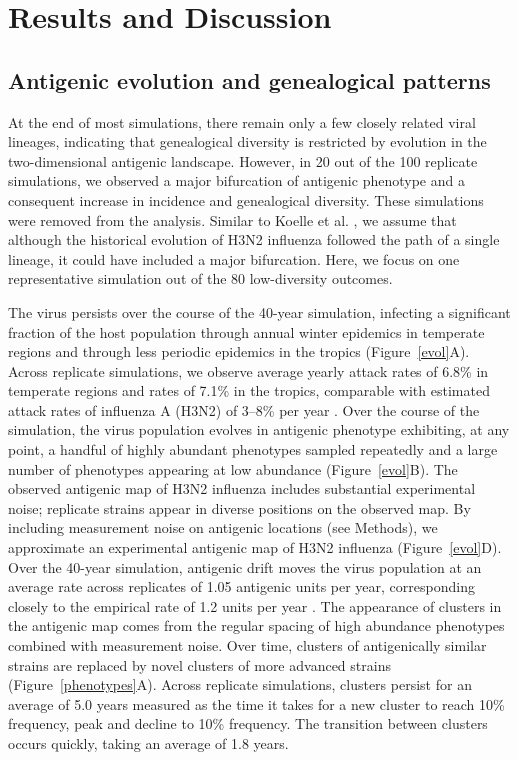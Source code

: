 \documentclass[11pt,oneside,letterpaper]{article}
\begin{document}
\section*{Results and Discussion}

\subsection*{Antigenic evolution and genealogical patterns}

At the end of most simulations, there remain only a few closely related viral lineages, indicating that genealogical diversity is restricted by evolution in the two-dimensional antigenic landscape.  However, in 20 out of the 100 replicate simulations, we observed a major bifurcation of antigenic phenotype and a consequent increase in incidence and genealogical diversity.  These simulations were removed from the analysis.   Similar to Koelle et al. \cite{Koelle11}, we assume that although the historical evolution of H3N2 influenza followed the path of a single lineage, it could have included a major bifurcation.  Here, we focus on one representative simulation out of the 80 low-diversity outcomes.

The virus persists over the course of the 40-year simulation, infecting a significant fraction of the host population through annual winter epidemics in temperate regions and through less periodic epidemics in the tropics (Figure~\ref{evol}A).  Across replicate simulations, we observe average yearly attack rates of 6.8\% in temperate regions and rates of 7.1\% in the tropics, comparable with estimated attack rates of influenza A (H3N2) of 3--8\% per year \cite{Monto93,Koelle09}.  Over the course of the simulation, the virus population evolves in antigenic phenotype exhibiting, at any point, a handful of highly abundant phenotypes sampled repeatedly and a large number of phenotypes appearing at low abundance (Figure~\ref{evol}B).  The observed antigenic map of H3N2 influenza includes substantial experimental noise; replicate strains appear in diverse positions on the observed map.  By including measurement noise on antigenic locations (see Methods), we approximate an experimental antigenic map of H3N2 influenza (Figure~\ref{evol}D).  Over the 40-year simulation, antigenic drift moves the virus population at an average rate across replicates of 1.05 antigenic units per year, corresponding closely to the empirical rate of 1.2 units per year \cite{Smith04}. The appearance of clusters in the antigenic map comes from the regular spacing of high abundance phenotypes combined with measurement noise.  Over time, clusters of antigenically similar strains are replaced by novel clusters of more advanced strains (Figure~\ref{phenotypes}A).  Across replicate simulations, clusters persist for an average of 5.0 years measured as the time it takes for a new cluster to reach 10\% frequency, peak and decline to 10\% frequency.  The transition between clusters occurs quickly, taking an average of 1.8 years.
\end{document}
